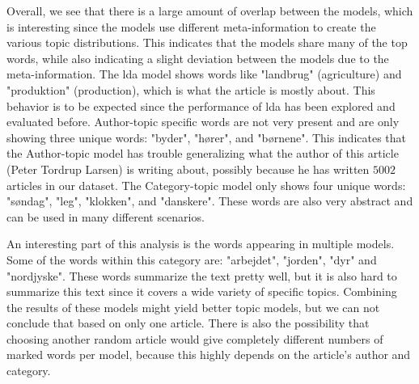 Overall, we see that there is a large amount of overlap between the models, which is interesting since the models use different meta-information to create the various topic distributions.
This indicates that the models share many of the top words, while also indicating a slight deviation between the models due to the meta-information.
The \gls{lda} model shows words like "landbrug" (agriculture) and "produktion" (production), which is what the article is mostly about.
This behavior is to be expected since the performance of \gls{lda} has been explored and evaluated before. 
Author-topic specific words are not very present and are only showing three unique words: "byder", "hører", and "børnene".
This indicates that the Author-topic model has trouble generalizing what the author of this article (Peter Tordrup Larsen) is writing about, possibly because he has written $5002$ articles in our dataset. 
The Category-topic model only shows four unique words: "søndag", "leg", "klokken", and "danskere".
These words are also very abstract and can be used in many different scenarios.

An interesting part of this analysis is the words appearing in multiple models.
Some of the words within this category are: "arbejdet", "jorden", "dyr" and "nordjyske".
These words summarize the text pretty well, but it is also hard to summarize this text since it covers a wide variety of specific topics.
Combining the results of these models might yield better topic models, but we can not conclude that based on only one article.
There is also the possibility that choosing another random article would give completely different numbers of marked words per model, because this highly depends on the article's author and category.
